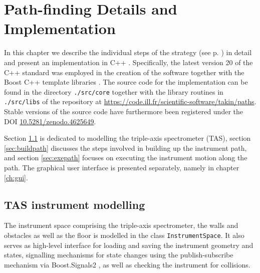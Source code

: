 %
%

\chapter{Path-finding Details and Implementation}
\label{ch:impl}

In this chapter we describe the individual steps of the strategy (see p. \pageref{sec:strategy}) in detail
and present an implementation in C++ \cite{Stroustrup2008, Stroustrup2018}. Specifically,
the latest version 20 of the C++ standard \cite{ISOCPP20} was employed in the creation of the software
together with the Boost C++ template libraries \cite{web_boost}. The source code for the implementation
can be found in the directory \lstinline|./src/core| together with the library routines in \lstinline|./src/libs|
of the repository at \url{https://code.ill.fr/scientific-software/takin/paths}. Stable versions of the
source code have furthermore been registered under the DOI \href{https://doi.org/10.5281/zenodo.4625649}{10.5281/zenodo.4625649}.

Section \ref{sec:tasmodel} is dedicated to modelling the triple-axis spectrometer (TAS), 
section \ref{sec:buildpath} discusses the steps involved in building up the instrument path, 
and section \ref{sec:exepath} focuses on executing the instrument motion along the path.
The graphical user interface is presented separately, namely in chapter \ref{ch:gui}.





\section{TAS instrument modelling}
\label{sec:tasmodel}

The instrument space comprising the triple-axis spectrometer, the walls and obstacles as well as the floor is modelled in
the class \lstinline[language=C++]|InstrumentSpace|. It also serves as high-level interface for loading and saving
the instrument geometry and states, signalling mechanisms for state changes using the publish-subscribe mechanism
via Boost.Signals2 \cite{web_boost_signals}, as well as checking the instrument for collisions.

